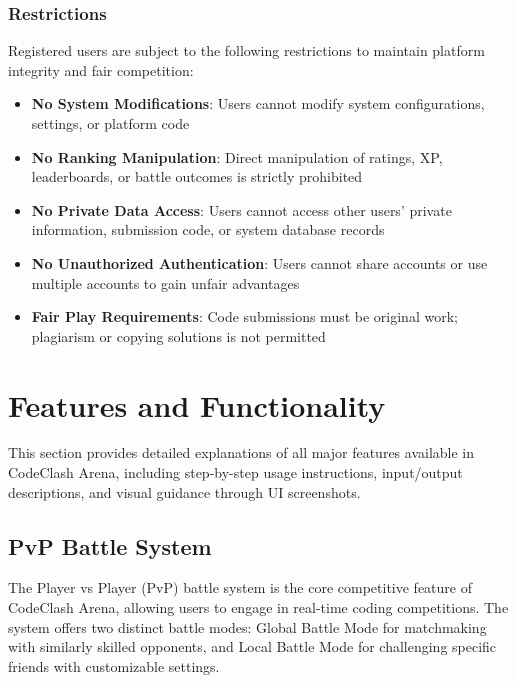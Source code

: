 \documentclass[12pt,a4paper]{article}
\begin{document}
\subsubsection{Restrictions}

Registered users are subject to the following restrictions to maintain platform integrity and fair competition:

\begin{itemize}[leftmargin=*]
\item \textbf{No System Modifications}: Users cannot modify system configurations, settings, or platform code
\item \textbf{No Ranking Manipulation}: Direct manipulation of ratings, XP, leaderboards, or battle outcomes is strictly prohibited
\item \textbf{No Private Data Access}: Users cannot access other users' private information, submission code, or system database records
\item \textbf{No Unauthorized Authentication}: Users cannot share accounts or use multiple accounts to gain unfair advantages
\item \textbf{Fair Play Requirements}: Code submissions must be original work; plagiarism or copying solutions is not permitted
\end{itemize}

\FloatBarrier


\section{Features and Functionality}

This section provides detailed explanations of all major features available in CodeClash Arena, including step-by-step usage instructions, input/output descriptions, and visual guidance through UI screenshots.

\subsection{PvP Battle System}

The Player vs Player (PvP) battle system is the core competitive feature of CodeClash Arena, allowing users to engage in real-time coding competitions. The system offers two distinct battle modes: Global Battle Mode for matchmaking with similarly skilled opponents, and Local Battle Mode for challenging specific friends with customizable settings.
\end{document}
